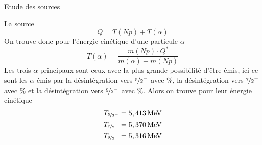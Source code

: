 \documentclass[a4paper,11pt]{scrartcl}
\begin{document}
\begin{section}{Etude des sources}
\begin{subsection}{La source }
   \begin{equation*}
    Q=T(Np)+T(\alpha)
   \end{equation*}
   On trouve donc pour l'énergie cinétique d'une particule $\alpha$    
   \begin{equation*}
    T(\alpha)=\frac{m(Np)\cdot Q^{\ast}}{m(\alpha)+m(Np)}
   \end{equation*}
   Les trois $\alpha$ principaux sont ceux avec la plus grande possibilité d'être émis, ici ce sont les $\alpha$ émis par la désintégration vers  $\nicefrac{5}{2}^-$ avec \unit[84,85]{\%}, la désintégration vers  $\nicefrac{7}{2}^-$ avec \unit[13,23]{\%} et la désintégration vers  $\nicefrac{9}{2}^-$ avec \unit[1,66]{\%}. Alors on trouve pour leur énergie cinétique
   \begin{eqnarray*}
    T_{\nicefrac{5}{2}^-}=\unit[5,413]{MeV}\\
    T_{\nicefrac{7}{2}^-}=\unit[5,370]{MeV}\\
    T_{\nicefrac{9}{2}^-}=\unit[5,316]{MeV}
   \end{eqnarray*}
  \end{subsection}
 

\end{section}
\end{document}
